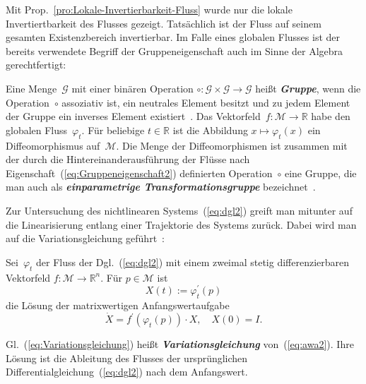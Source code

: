 Mit Prop.~\ref{pro:Lokale-Invertierbarkeit-Fluss} wurde nur die
lokale Invertiertbarkeit des Flusses gezeigt.
Tatsächlich ist der Fluss auf seinem gesamten Existenzbereich invertierbar.
Im Falle eines globalen Flusses ist der bereits verwendete Begriff
der Gruppen\-eigen\-schaft auch im Sinne der Algebra gerechtfertigt:
\begin{remark}
\label{rem:Gruppeneigenschaft}Eine Menge~$\mathcal{G}$
mit einer binären Operation $\circ:\mathcal{G}\times\mathcal{G}\to\mathcal{G}$
heißt \textbf{\em Gruppe}, wenn die Operation~$\circ$ assoziativ
ist, ein neutrales Element besitzt und zu jedem Element der Gruppe
ein inverses Element existiert~\cite{waerden1,bronstein2000,zeidler2003}.
Das Vektorfeld~$f:\mathcal{M}\to\mathbb{R}$ habe den globalen Fluss~$\varphi_{t}$.
Für beliebige $t\in\mathbb{R}$ ist die Abbildung $x\mapsto\varphi_{t}(x)$
ein Diffeomorphismus auf~$\mathcal{M}$.
Die Menge der Diffeomorphismen ist zusammen mit der durch die Hintereinanderausführung
der Flüsse nach Eigenschaft~(\ref{eq:Gruppeneigenschaft2}) definierten
Operation~$\circ$ eine Gruppe, die man auch als \textbf{\em einparametrige
Transformationsgruppe} bezeichnet~\cite{stephani1994,arnold2001,kuehnel2011}.
\end{remark}
\medskip{}
Zur Untersuchung des nichtlinearen Systems~(\ref{eq:dgl2}) greift
man mitunter auf die Linearisierung entlang einer Trajektorie des
Systems zurück. Dabei wird man auf die Variationsgleichung geführt~\cite[Kap.~{32}]{arnold2001}:
\begin{proposition}
[Variationsgleichung]\label{pro:Variationsgleichung}Sei~$\varphi_{t}$
der Fluss der Dgl.~(\ref{eq:dgl2}) mit einem zweimal stetig differenzierbaren
Vektorfeld $f:\mathcal{M}\to{\mathbb{R}}^{n}$. Für $p\in\mathcal{M}$ ist
\begin{equation}
X(t):=\varphi_{t}^{\prime}(p)\label{eq:Loesung_Variationsgleichung}
\end{equation}
 die Lösung der matrixwertigen Anfangswertaufgabe
\begin{equation}
\dot{X}=f^{\prime}(\varphi_{t}(p))\cdot X,\quad X(0)=I.\label{eq:Variationsgleichung}
\end{equation}
\end{proposition}
Gl.~(\ref{eq:Variationsgleichung}) heißt \textbf{\em Variationsgleichung}
von~(\ref{eq:awa2}). Ihre Lösung ist die Ableitung des Flusses der
ursprünglichen Differentialgleichung~(\ref{eq:dgl2}) nach dem Anfangswert.

